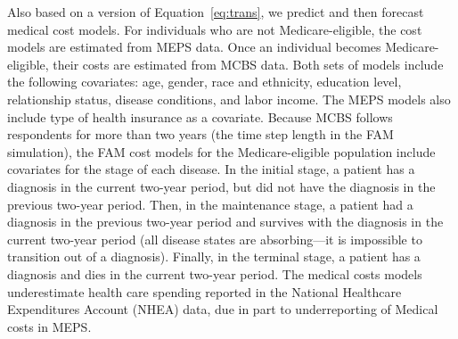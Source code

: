 \noindent Also based on a version of Equation~\eqref{eq:trans}, we predict and then forecast medical cost models. For individuals who are not Medicare-eligible, the cost models are estimated from MEPS data. Once an individual becomes Medicare-eligible, their costs are estimated from MCBS data. Both sets of models include the following covariates: age, gender, race and ethnicity, education level, relationship status, disease conditions, and labor income. The MEPS models also include type of health insurance as a covariate. Because MCBS follows respondents for more than two years (the time step length in the FAM simulation), the FAM cost models for the Medicare-eligible population include covariates for the stage of each disease. In the initial stage, a patient has a diagnosis in the current two-year period, but did not have the diagnosis in the previous two-year period. Then, in the maintenance stage, a patient had a diagnosis in the previous two-year period and survives with the diagnosis in the current two-year period (all disease states are absorbing---it is impossible to transition out of a diagnosis). Finally, in the terminal stage, a patient has a diagnosis and dies in the current two-year period. The medical costs models underestimate health care spending reported in the National Healthcare Expenditures Account (NHEA) data, due in part to underreporting of Medical costs in MEPS.
%

